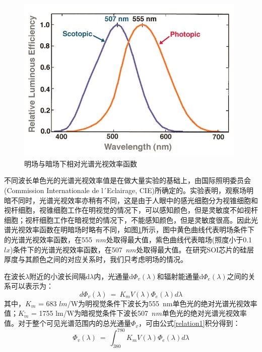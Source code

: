 \begin{figure}[htb]
	\centering
	\includegraphics[width=11cm]{./Pictures/color_luminous_efficiency.jpg}
	\captionsetup{justification=centering}
	\caption{明场与暗场下相对光谱光视效率函数\cite{webvision}}
	\label{color_luminous_efficiency}
\end{figure}

不同波长单色光的光谱光视效率值是在做大量实验的基础上，由国际照明委员会(Commission Internationale de l´Eclairage, CIE)所确定的。实验表明，观察场明暗不同时，光谱光视效率亦稍有不同，这是由于人眼中的感光细胞分为视锥细胞和视杆细胞，视锥细胞工作在明视觉的情况下，可以感知颜色，但是灵敏度不如视杆细胞；视杆细胞工作在暗视觉的情况下，不能感知颜色，但是灵敏度很高。因此光谱光视效率函数在明暗场时略有不同，如图\ref{color_luminous_efficiency}所示，图中黄色曲线代表明场条件下的光谱光视效率函数，在555~$nm$处取得最大值，紫色曲线代表暗场(照度小于0.1~$lx$)\cite{hunt1995reproduction}条件下的光谱光视效率函数，在507~$nm$处取得最大值。在研究SOI芯片的硅层厚度与其颜色之间的对应关系时，我们只考虑明场的情况。

在波长$\lambda$附近的小波长间隔d$\lambda$内，光通量d$\Phi_{v}(\lambda)$和辐射能通量d$\Phi_{e}(\lambda)$之间的关系可以表示为：
\begin{equation}
\label{relation1}
d\Phi_{v}(\lambda)~=~K_{m}V(\lambda)\Phi_{e}(\lambda)d\lambda
\end{equation}
其中，$K_{m}$ = 683 $lm$/W为明视觉条件下波长为555~nm单色光的绝对光谱光视效率值；$K_{m}^{,}$ = 1755 lm/W为暗视觉条件下波长507~$nm$单色光的绝对光谱光视效率值。对于整个可见光谱范围内的总光通量$\Phi_{v}$，可由公式\ref{relation1}积分得到：
\begin{equation}
\label{relation3}
\Phi_{v}(\lambda)~=~\int_{380}^{780}K_{m}V(\lambda)\Phi_{e}(\lambda)d\lambda
\end{equation}

